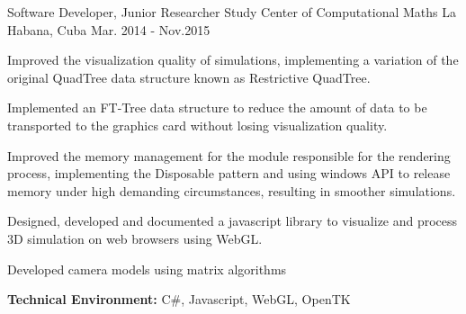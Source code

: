 \begin{cventries}

\workexperienceentry
{Software Developer, Junior Researcher} %
{Study Center of Computational Maths} %
{La Habana, Cuba} %
{Mar. 2014 - Nov.2015} %
{ %
\begin{cvitems}
	\item {Improved the visualization quality of simulations, implementing a variation of the original QuadTree data structure known as Restrictive QuadTree.}
	\item {Implemented an FT-Tree data structure to reduce the amount of data to be transported to the graphics card without losing visualization quality.}
	\item {Improved the memory management for the module responsible for the rendering process, implementing the Disposable pattern and using windows API to release memory under high demanding circumstances, resulting in smoother simulations.}
	\item {Designed, developed and documented a javascript library to visualize and process 3D simulation on web browsers
	using WebGL.}
	\item {Developed camera models using matrix algorithms}
\end{cvitems}
}
{\textbf{Technical Environment:} C\#, Javascript, WebGL, OpenTK}
\end{cventries}